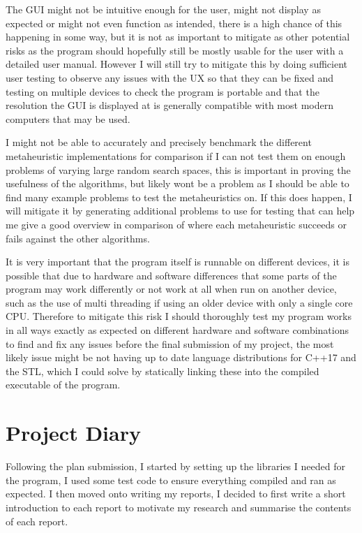 \documentclass[]{final_report}
\begin{document}
The GUI might not be intuitive enough for the user, might not display as expected or might not even function as intended, there is a high chance of this happening in some way, but it is not as important to mitigate as other potential risks as the program should hopefully still be mostly usable for the user with a detailed user manual. However I will still try to mitigate this by doing sufficient user testing to observe any issues with the UX so that they can be fixed and testing on multiple devices to check the program is portable and that the resolution the GUI is displayed at is generally compatible with most modern computers that may be used.

I might not be able to accurately and precisely benchmark the different metaheuristic implementations for comparison if I can not test them on enough problems of varying large random search spaces, this is important in proving the usefulness of the algorithms, but likely wont be a problem as I should be able to find many example problems to test the metaheuristics on. If this does happen, I will mitigate it by generating additional problems to use for testing that can help me give a good overview in comparison of where each metaheuristic succeeds or fails against the other algorithms.

It is very important that the program itself is runnable on different devices, it is possible that due to hardware and software differences that some parts of the program may work differently or not work at all when run on another device, such as the use of multi threading if using an older device with only a single core CPU. Therefore to mitigate this risk I should thoroughly test my program works in all ways exactly as expected on different hardware and software combinations to find and fix any issues before the final submission of my project, the most likely issue might be not having up to date language distributions for C++17 and the STL, which I could solve by statically linking these into the compiled executable of the program.

\newpage
\section*{Project Diary}

Following the plan submission, I started by setting up the libraries I needed for the program, I used some test code to ensure everything compiled and ran as expected. I then moved onto writing my reports, I decided to first write a short introduction to each report to motivate my research and summarise the contents of each report.
\end{document}
